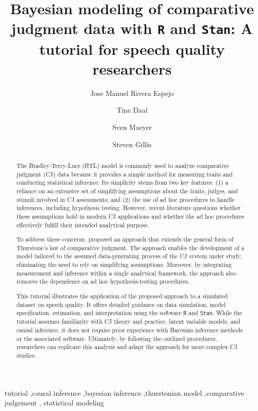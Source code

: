 \documentclass[
  authoryear,
  review,
  1p]{elsarticle}
\begin{document}
\begin{frontmatter}
\title{Bayesian modeling of comparative judgment data with \texttt{R}
and \texttt{Stan}: A tutorial for speech quality researchers}
\author[1]{Jose Manuel Rivera Espejo%
%
}
\author[1]{Tine Daal%
%
}
\author[1]{Sven Maeyer%
%
}
\author[2]{Steven Gillis%
%
}






        
\begin{abstract}
The Bradley-Terry-Luce (BTL) model is commonly used to analyze
comparative judgment (CJ) data because it provides a simple method for
measuring traits and conducting statistical inference. Its simplicity
stems from two key features: (1) a reliance on an extensive set of
simplifying assumptions about the traits, judges, and stimuli involved
in CJ assessments; and (2) the use of ad hoc procedures to handle
inferences, including hypothesis testing. However, recent literature
questions whether these assumptions hold in modern CJ applications and
whether the ad hoc procedures effectively fulfill their intended
analytical purpose.

To address these concerns, \citet{Rivera_et_al_2025} proposed an
approach that extends the general form of Thurstone's law of comparative
judgment. The approach enables the development of a model tailored to
the assumed data-generating process of the CJ system under study,
eliminating the need to rely on simplifying assumptions. Moreover, by
integrating measurement and inference within a single analytical
framework, the approach also removes the dependence on ad hoc
hypothesis-testing procedures.

This tutorial illustrates the application of the proposed approach to a
simulated dataset on speech quality. It offers detailed guidance on data
simulation, model specification, estimation, and interpretation using
the software \texttt{R} and \texttt{Stan}. While the tutorial assumes
familiarity with CJ theory and practice, latent variable models, and
causal inference, it does not require prior experience with Bayesian
inference methods or the associated software. Ultimately, by following
the outlined procedures, researchers can replicate this analysis and
adapt the approach for more complex CJ studies.
\end{abstract}





\begin{keyword}
    tutorial \sep causal inference \sep bayesian
inference \sep thurstonian model \sep comparative judgement \sep 
    statistical modeling
\end{keyword}
\end{frontmatter}
    
\end{document}
